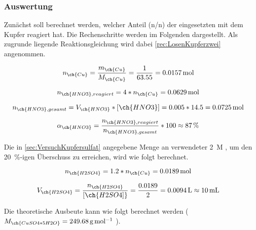 \documentclass{article}
\begin{document}
     
      \subsubsection{Auswertung} \label{sec:AuswertungKupfersulfat}
      
        Zunächst soll berechnet werden, welcher Anteil (n/n) der eingesetzten  mit dem Kupfer reagiert hat. Die Rechenschritte werden im Folgenden dargestellt. Als zugrunde liegende Reaktionsgleichung wird dabei \ref{rec:LosenKupferzwei} angenommen.
        
        \begin{equation}
          n_{\ch{Cu}} = \frac{m_{\ch{Cu}}}{M_{\ch{Cu}}} = \frac{1}{63.55} = \SI[mode=text]{0.0157}{\mole}
        \end{equation}
        
        \begin{equation}
          n_{\ch{HNO3}, reagiert} = 4 * n_{\ch{Cu}} = \SI[mode=text]{0.0629}{\mole}
        \end{equation}
        
        \begin{equation}
          n_{\ch{HNO3}, gesamt} = V_{\ch{HNO3}} * [\ch{HNO3}] = 0.005 * 14.5 = \SI[mode=text]{0.0725}{\mole}
        \end{equation}
        
        \begin{equation}
          \alpha_{\ch{HNO3}} = \frac{n_{\ch{HNO3}, reagiert}}{n_{\ch{HNO3}, gesamt}} * 100 \approx \SI[mode=text]{87}{\percent} 
        \end{equation}
        
        Die in \ref{sec:VersuchKupfersulfat} angegebene Menge an verwendeter \SI[mode=text]{2}{M} , um den \SI[mode=text]{20}{\percent}-igen Überschuss zu erreichen, wird wie folgt berechnet.
        
        \begin{equation}
          n_{\ch{H2SO4}} = 1.2 * n_{\ch{Cu}} = \SI[mode=text]{0.0189}{\mole} 
        \end{equation}
        
        \begin{equation}
          V_{\ch{H2SO4}} = \frac{n_{\ch{H2SO4}}}{[\ch{H2SO4]}} = \frac{0.0189}{2} = \SI[mode=text]{0.0094}{\liter} \approx \SI[mode=text]{10}{\milli\liter}
        \end{equation}
      
        Die theoretische Ausbeute kann wie folgt berechnet werden ($M_{\ch{CuSO4 * 5 H2O}} = \SI[mode=text]{249.68}{\gram\per\mole}$ ).
        
\end{document}

